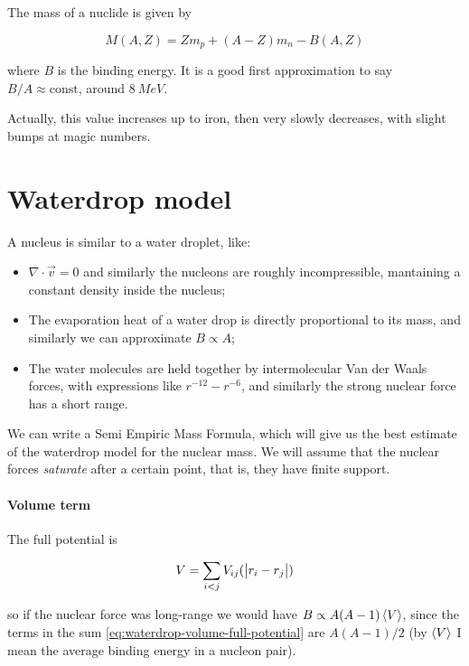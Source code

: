 \documentclass{article}
\begin{document}
The mass of a nuclide is given by

\begin{equation}
M (A, Z) = Z m_p + (A-Z) m_n - B(A, Z)
\end{equation}

 where \(B\) is the binding energy. It is a good first approximation to say \(B/A \approx \text{const}\), around \(\SI{8}{MeV} \).

Actually, this value increases up to iron, then very slowly decreases, with slight bumps at magic numbers.

\section{Waterdrop model}

A nucleus is similar to a water droplet, like:

\begin{itemize}
    \item \(\nabla \cdot \vec{v} = 0  \) and similarly the nucleons are roughly incompressible, mantaining a constant density inside the nucleus;
    \item The evaporation heat of a water drop is directly proportional to its mass, and similarly we can approximate \(B \propto A\);
    \item The water molecules are held together by intermolecular Van der Waals forces, with expressions like \(r ^{-12} - r ^{-6} \), and similarly the strong nuclear force has a short range.
\end{itemize}

We can write a Semi Empiric Mass Formula, which will give us  the best estimate of the waterdrop model for the nuclear mass. We will assume that the nuclear forces \emph{saturate} after a certain point, that is, they have finite support.

\paragraph{Volume term}

The full potential is

\begin{equation} \label{eq:waterdrop-volume-full-potential}
    V = \sum _{i<j} V_{ij} (\abs{r_i - r_j})
\end{equation}

so if the nuclear force was long-range we would have \(B \propto A (A-1) \expval{V} \), since the terms in the sum \eqref{eq:waterdrop-volume-full-potential}  are \(A(A-1)/2\) (by \(\expval{V} \) I mean the average binding energy in a nucleon pair).
\end{document}
